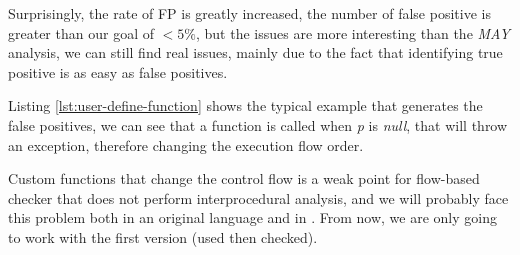 Surprisingly, the rate of FP is greatly increased, the number of false positive is greater than our goal of $<5\%$, but the issues are more interesting than the \emph{MAY} analysis, we can still find real issues, mainly due to the fact that identifying true positive is as easy as false positives.

 

Listing \ref{lst:user-define-function} shows the typical example that generates the false positives, we can see that a function is called when \emph{p} is \emph{null}, that will throw an exception, therefore changing the execution flow order.

Custom functions that change the control flow is a weak point for flow-based checker that does not perform interprocedural analysis, and we will probably face this problem both in an original language and in \slang{}. 
From now, we are only going to work with the first version (used then checked).




